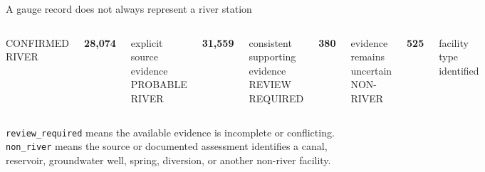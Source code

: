 \documentclass[t,aspectratio=169,10pt]{beamer}
\begin{document}
\begin{frame}{A gauge record does not always represent a river station}
  \vspace*{0.62cm}
  \begin{columns}[c,totalwidth=0.94\textwidth]
      \centering
      {\sffamily\scriptsize\color{GSGDMuted}CONFIRMED RIVER}\par
      {\bfseries\Huge 28,074}\par
      \small explicit source evidence
      \centering
      {\sffamily\scriptsize\color{GSGDMuted}PROBABLE RIVER}\par
      {\bfseries\Huge 31,559}\par
      \small consistent supporting evidence
      \centering
      {\sffamily\scriptsize\color{GSGDMuted}REVIEW REQUIRED}\par
      {\bfseries\Huge\color{GSGDGold}380}\par
      \small evidence remains uncertain
      \centering
      {\sffamily\scriptsize\color{GSGDMuted}NON-RIVER}\par
      {\bfseries\Huge\color{GSGDRed}525}\par
      \small facility type identified
  \end{columns}

  \vspace{0.78cm}
  \centering
  \begin{minipage}{0.88\textwidth}
    \small
    \texttt{review\_required} means the available evidence is incomplete or conflicting.
    \texttt{non\_river} means the source or documented assessment identifies a canal,
    reservoir, groundwater well, spring, diversion, or another non-river facility.
  \end{minipage}
\end{frame}
\end{document}
